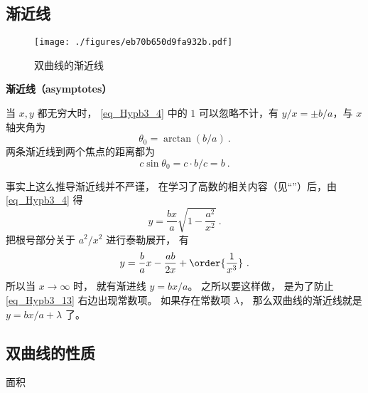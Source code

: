 \subsection{渐近线}
\begin{figure}[ht]
\centering
\texttt{[image: ./figures/eb70b650d9fa932b.pdf]}
\caption{双曲线的渐近线} \label{fig_Hypb3_1}
\end{figure}
\textbf{渐近线（asymptotes）}

当 $x,y$ 都无穷大时， \autoref{eq_Hypb3_4} 中的 $1$ 可以忽略不计，有 $y/x = \pm b/a$，与 $x$ 轴夹角为
\begin{equation}\label{eq_Hypb3_1}
\theta_0 = \arctan(b/a)~.
\end{equation}
两条渐近线到两个焦点的距离都为
\begin{equation}\label{eq_Hypb3_11}
c\sin\theta_0 = c\cdot b/c = b~.
\end{equation}

事实上这么推导渐近线并不严谨， 在学习了高数的相关内容（见“”）后，由\autoref{eq_Hypb3_4} 得
\begin{equation}
y = \frac{bx}{a} \sqrt{1-\frac{a^2}{x^2}}~.
\end{equation}
把根号部分关于 $a^2/x^2$ 进行泰勒展开， 有
\begin{equation}\label{eq_Hypb3_13}
y = \frac ba x - \frac{ab}{2x} + \order{\frac{1}{x^3}}~.
\end{equation}
所以当 $x\to\infty$ 时， 就有渐进线 $y = bx/a$。 之所以要这样做， 是为了防止\autoref{eq_Hypb3_13} 右边出现常数项。 如果存在常数项 $\lambda$， 那么双曲线的渐近线就是 $y = bx/a + \lambda$ 了。

\subsection{双曲线的性质}
面积









